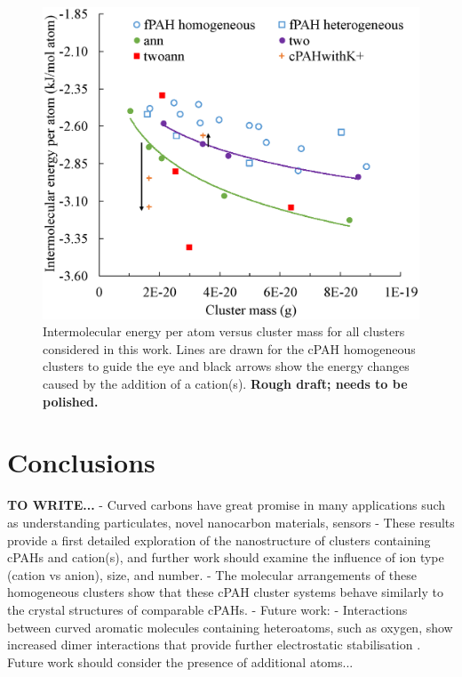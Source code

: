 %
\begin{figure}[!tbh]
\centering
\includegraphics[width=0.5\linewidth]{Figures/energies.eps}
\caption{Intermolecular energy per atom versus cluster mass for all clusters considered in this work. Lines are drawn for the cPAH homogeneous clusters to guide the eye and black arrows show the energy changes caused by the addition of a cation(s). \textbf{Rough draft; needs to be polished.}}
\label{fig:energies}
\end{figure}
%

%

\section{Conclusions}
\textbf{TO WRITE...}
- Curved carbons have great promise in many applications such as understanding particulates, novel nanocarbon materials, sensors
- These results provide a first detailed exploration of the nanostructure of clusters containing cPAHs and cation(s), and further work should examine the influence of ion type (cation vs anion), size, and number.
- The molecular arrangements of these homogeneous clusters show that these cPAH cluster systems behave similarly to the crystal structures of comparable cPAHs.
- Future work:
- Interactions between curved aromatic molecules containing heteroatoms, such as oxygen, show increased dimer interactions that provide further electrostatic stabilisation \cite{Cabaleiro-Lago2018}.  Future work should consider the presence of additional atoms...

